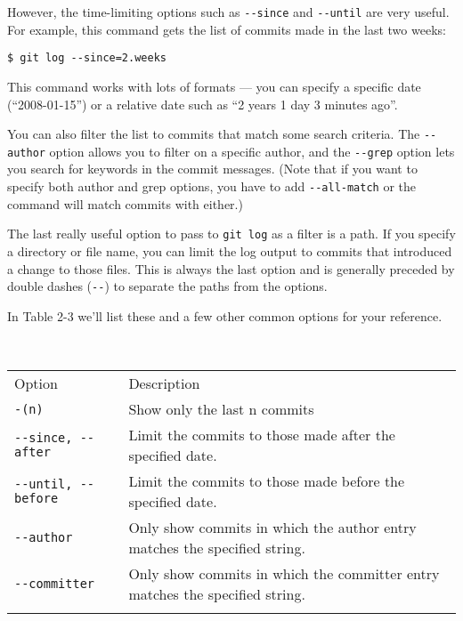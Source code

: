\documentclass[a4paper]{book}
\newcounter{tab}[chapter]
\begin{document}
However, the time-limiting options such as \texttt{-{}-since} and \texttt{-{}-until} are very useful. For example, this command gets the list of commits made in the last two weeks:

\begin{shaded}\begin{verbatim}
$ git log --since=2.weeks
\end{verbatim}\end{shaded}

This command works with lots of formats --- you can specify a specific date (“2008-01-15”) or a relative date such as “2 years 1 day 3 minutes ago”.

You can also filter the list to commits that match some search criteria. The \texttt{-{}-author} option allows you to filter on a specific author, and the \texttt{-{}-grep} option lets you search for keywords in the commit messages. (Note that if you want to specify both author and grep options, you have to add \texttt{-{}-all-match} or the command will match commits with either.)

The last really useful option to pass to \texttt{git log} as a filter is a path. If you specify a directory or file name, you can limit the log output to commits that introduced a change to those files. This is always the last option and is generally preceded by double dashes (\texttt{-{}-}) to separate the paths from the options.

In Table 2-3 we'll list these and a few other common options for your reference.

\begin{longtable}[c]{@{}lp{10cm}@{}}
\caption{~}\\
\toprule\addlinespace
Option & Description
\\\addlinespace
\midrule\endhead
\texttt{-(n)} & Show only the last n commits
\\\addlinespace
\texttt{-{}-since, -{}-after} & Limit the commits to those made after the specified date.
\\\addlinespace
\texttt{-{}-until, -{}-before} & Limit the commits to those made before the specified date.
\\\addlinespace
\texttt{-{}-author} & Only show commits in which the author entry matches the specified string.
\\\addlinespace
\texttt{-{}-committer} & Only show commits in which the committer entry matches the specified string.
\\\addlinespace
\bottomrule
\end{longtable}
\end{document}
